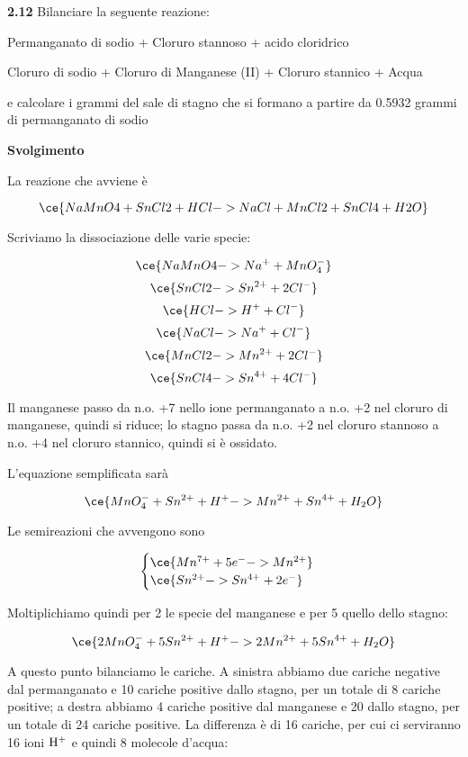 \vspace{0.2cm}\textbf{2.12} Bilanciare la seguente reazione:

\begin{center}
    Permanganato di sodio + Cloruro stannoso + acido cloridrico \ce{->}

    \ce{->} Cloruro di sodio + Cloruro di Manganese (II) + Cloruro stannico + Acqua
\end{center}

e calcolare i grammi del sale di stagno che si formano a partire da 0.5932 grammi di permanganato di sodio

\vspace{0.2cm}\large\textbf{Svolgimento}\normalsize

\vspace{0.2cm}La reazione che avviene è

$$\ce{NaMnO4 + SnCl2 + HCl -> NaCl + MnCl2 + SnCl4 + H2O}$$

Scriviamo la dissociazione delle varie specie:

$$\ce{NaMnO4 -> Na^+ + MnO_4^-}$$
$$\ce{SnCl2 -> Sn^{2+} + 2Cl^-}$$
$$\ce{HCl -> H^+ + Cl^-}$$
$$\ce{NaCl -> Na^+ + Cl^-}$$
$$\ce{MnCl2 -> Mn^{2+} + 2Cl^-}$$
$$\ce{SnCl4 -> Sn^{4+} + 4Cl^-}$$

Il manganese passo da n.o. +7 nello ione permanganato a n.o. +2 nel cloruro di
manganese, quindi si riduce; lo stagno passa da n.o. +2 nel cloruro stannoso a n.o. +4 nel cloruro stannico, quindi si è ossidato.

L'equazione semplificata sarà

$$\ce{MnO_4^- + Sn^{2+} + H^+ -> Mn^{2+} + Sn^{4+} + H_2O}$$

Le semireazioni che avvengono sono

$$\begin{cases}
    \ce{Mn^{7+} + 5e^- -> Mn^{2+}}\\
    \ce{Sn^{2+} -> Sn^{4+} + 2e^-}
\end{cases}$$

Moltiplichiamo quindi per 2 le specie del manganese e per 5 quello dello stagno:

$$\ce{2MnO_4^- + 5Sn^{2+} + H^+ -> 2Mn^{2+} + 5Sn^{4+} + H_2O}$$

A questo punto bilanciamo le cariche. A sinistra abbiamo due cariche negative dal permanganato e 10 cariche positive dallo stagno, per un totale di 8 cariche positive; a destra abbiamo 4 cariche positive dal manganese e 20 dallo stagno, per un totale di 24 cariche positive. La differenza è di 16 cariche, per cui ci serviranno 16 ioni $\rm H^+$ e quindi 8 molecole d'acqua: 

